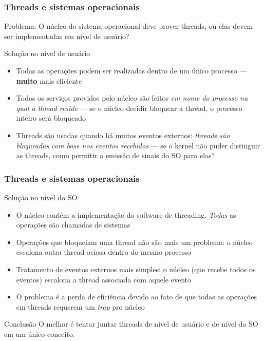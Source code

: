 \documentclass[Ligatures=TeX,table,brazil,svgnames,usetotalslideindicator,compress,10pt]{beamer}
\begin{document}
\begin{frame}
  \frametitle{Threads e sistemas operacionais}
  \begin{alertblock}{Problema:}
    O núcleo do sistema operacional deve prover threads, ou elas devem
    ser implementadas em nível de usuário?
  \end{alertblock}

  \begin{block}{Solução no nível de usuário}
    \begin{itemize}
    \item Todas as operações podem ser realizadas \alert{dentro de um
        único processo} --- \textbf{muito} mais eficiente
    \item Todos os serviços providos pelo núcleo são feitos \emph{em
        nome do processo na qual a thread reside} --- se o núcleo
      decidir bloquear a thread, o processo inteiro será bloqueado
    \item Threads são usadas quando há muitos eventos externos:
      \emph{threads são bloqueadas com base nos eventos recebidos} ---
      se o kernel não puder distinguir as threads, como permitir a
      emissão de sinais do SO para elas?
    \end{itemize}
  \end{block}

\end{frame}

\begin{frame}
  \frametitle{Threads e sistemas operacionais}
  \begin{block}{Solução no nível do SO}
    \begin{itemize}
    \item O núcleo contém a implementação do software de
      threading. \emph{Todas} as operações são chamadas de sistemas
    \item Operações que bloqueiam uma thread não são mais um problema:
      o núcleo escalona outra thread ociosa dentro do mesmo processo
    \item Tratamento de eventos externos mais simples: o núcleo (que
      recebe todos os eventos) escalona a thread associada com aquele
      evento
    \item O problema é a perda de eficiência devido ao fato de que
      todas as operações em threads requerem um \textit{trap} pro
      núcleo
    \end{itemize}
  \end{block}

  \begin{alertblock}{Conclusão}
    O melhor é tentar juntar threads de nível de usuário e de nível do
    SO em um único conceito.
  \end{alertblock}

\end{frame}
\end{document}
